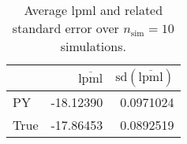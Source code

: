 \begin{table}[H]

\caption{Average lpml and related standard error over $n_{\text{sim}} = 10$ simulations.}
\centering
\begin{tabular}[t]{lrr}
\toprule
  & $\overbar{\text{lpml}}$ & $\text{sd}(\overbar{\text{lpml}})$\\
\midrule
PY & -18.12390 & 0.0971024\\
True & -17.86453 & 0.0892519\\
\bottomrule
\end{tabular}
\end{table}